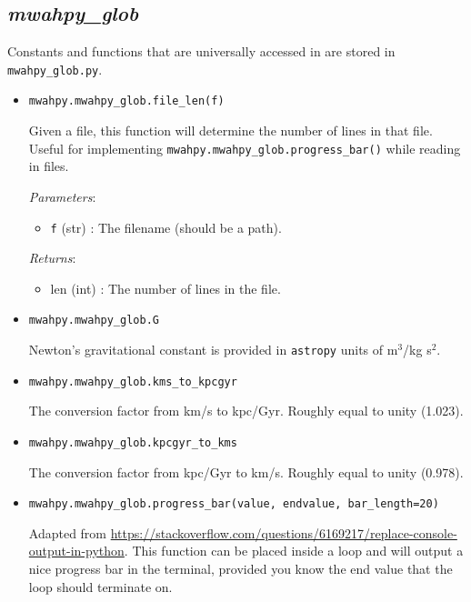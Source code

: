 \documentclass{article}
\begin{document}
\subsection{\textit{mwahpy\_glob}}

Constants and functions that are universally accessed in \mwahpy are stored in \verb!mwahpy_glob.py!. 

\begin{itemize}

\item \verb!mwahpy.mwahpy_glob.file_len(f)!

Given a file, this function will determine the number of lines in that file. Useful for implementing \verb!mwahpy.mwahpy_glob.progress_bar()! while reading in files. 

\textit{Parameters}: \begin{itemize}

\item \verb!f! (str) : The filename (should be a path).

\end{itemize}

\textit{Returns}: \begin{itemize} 

\item len (int) : The number of lines in the file. 

\end{itemize}




\item \verb!mwahpy.mwahpy_glob.G!

Newton's gravitational constant is provided in \verb!astropy! units of m$^3$/kg s$^2$.

\item \verb!mwahpy.mwahpy_glob.kms_to_kpcgyr!

The conversion factor from km/s to kpc/Gyr. Roughly equal to unity (1.023).

\item \verb!mwahpy.mwahpy_glob.kpcgyr_to_kms!

The conversion factor from kpc/Gyr to km/s. Roughly equal to unity (0.978).

\item \verb!mwahpy.mwahpy_glob.progress_bar(value, endvalue, bar_length=20)!

Adapted from \url{https://stackoverflow.com/questions/6169217/replace-console-output-in-python}. This function can be placed inside a loop and will output a nice progress bar in the terminal, provided you know the end value that the loop should terminate on. 


\end{itemize}
\end{document}
